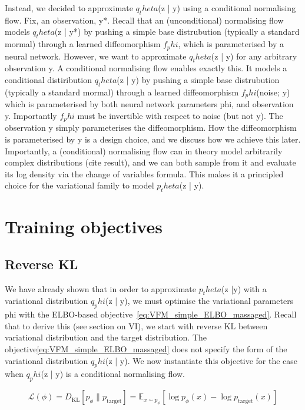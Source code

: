 \documentclass[12pt,a4paper]{report}
\begin{document}
Instead, we decided to approximate $q_theta$(z | y) using a conditional normalising flow. 
Fix, an observation, y*. 
Recall that an (unconditional) normalising flow models $q_theta$(z | y*) by pushing a simple base distrubution (typically a standard mormal) through a learned diffeomorphism $f_phi$, which is parameterised by a neural network. 
However, we want to approximate $q_theta$(z | y) for any arbitrary observation y. 
A conditional normalising flow enables exactly this. 
It models a conditional distiribution $q_theta$(z | y) by pushing a simple base distrubution (typically a standard mormal) through a learned diffeomorphism $f_phi$(noise; y) which is parameterised by both neural network parameters phi, and observation y. 
Importantly $f_phi$ must be invertible with respect to noise (but not y). The observation y simply parameterises the diffeomorphism. 
How the diffeomorphism is parameterised by y is a design choice, and we discuss how we achieve this later. 
Importantly, a (conditional) normalising flow can in theory model arbitrarily complex distributions (cite result), and we can both sample from it and evaluate its log density via the change of variables formula. 
This makes it a principled choice for the variational family to model $p_theta$(z | y). 

\section{Training objectives}
\subsection{Reverse KL}
We have already shown that in order to approximate $p_theta$(z |y) with a variational distribution $q_phi$(z | y), we must optimise the variational parameters phi with the ELBO-based objective~\ref{eq:VFM_simple_ELBO_massaged}. 
Recall that to derive this (see section on VI), we start with reverse KL between variational distribution and the target distribution. 
The objective\ref{eq:VFM_simple_ELBO_massaged} does not specify the form of the variational distribution $q_phi$(z | y). We now instantiate this objective for the case when $q_phi$(z | y) is a conditional normalising flow. 

\begin{equation}
    \label{eq:reverse_KL_NF}
    \mathcal{L}(\phi) = D_{\mathrm{KL}} \left[ p_\phi \parallel p_{\text{target}} \right] = \mathbb{E}_{x \sim p_\phi} \left[ \log p_\phi(x) - \log p_{\text{target}}(x) \right] 
\end{equation}
\end{document}
